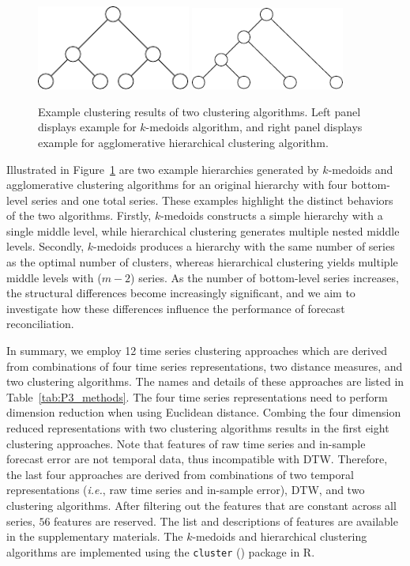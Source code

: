 \documentclass[a4paper,review,12pt,authoryear]{elsarticle}
\begin{document}
\begin{figure}[h!]
    \centering
    \includegraphics[width=0.45\textwidth]{figures/pamcluster.pdf}
    \hspace{1cm}
    \includegraphics[width=0.45\textwidth]{figures/aggcluster.pdf}
    \caption{\label{fig:cluster_example}Example clustering results of two clustering algorithms. Left panel displays example for $k$-medoids algorithm, and right panel displays example for agglomerative hierarchical clustering algorithm.}
\end{figure}
Illustrated in Figure~\ref{fig:cluster_example} are two example hierarchies generated by $k$-medoids and agglomerative clustering algorithms for an original hierarchy with four bottom-level series and one total series. These examples highlight the distinct behaviors of the two algorithms.
Firstly, $k$-medoids constructs a simple hierarchy with a single middle level, while hierarchical clustering generates multiple nested middle levels. 
Secondly, $k$-medoids produces a hierarchy with the same number of series as the optimal number of clusters, whereas hierarchical clustering yields multiple middle levels with ($m-2$) series.
As the number of bottom-level series increases, the structural differences become increasingly significant, and we aim to investigate how these differences influence the performance of forecast reconciliation.




In summary, we employ 12 time series clustering approaches which are derived from combinations of four time series representations, two distance measures, and two clustering algorithms. The names and details of these approaches are listed in Table~\ref{tab:P3_methods}. The four time series representations need to perform dimension reduction when using Euclidean distance. Combing the four dimension reduced representations with two clustering algorithms results in the first eight clustering approaches. Note that features of raw time series and in-sample forecast error are not temporal data, thus incompatible with DTW. Therefore, the last four approaches are derived from combinations of two temporal representations (\textit{i.e.}, raw time series and in-sample error), DTW, and two clustering algorithms. After filtering out the features that are constant across all series, $56$ features are reserved. The list and descriptions of features are available in the supplementary materials. The $k$-medoids and hierarchical clustering algorithms are implemented using the \texttt{cluster} (\citealp{cluster}) package in R.
\end{document}

